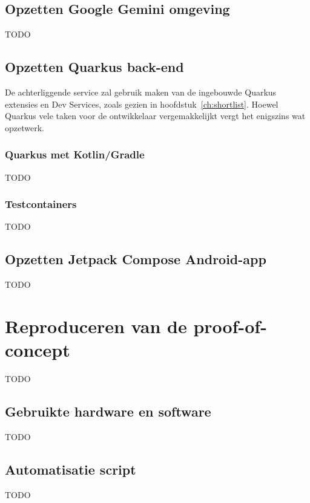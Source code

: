 \subsection{Opzetten Google Gemini omgeving}
\label{subsec:aanmaken-google-gemini-profiel}
TODO

\subsection{Opzetten Quarkus back-end}
\label{subsec:opzetten-quarkus-back-end}
De achterliggende service zal gebruik maken van de ingebouwde Quarkus extensies en Dev Services, zoals gezien in hoofdstuk~\ref{ch:shortlist}.
Hoewel Quarkus vele taken voor de ontwikkelaar vergemakkelijkt vergt het enigszins wat opzetwerk.

\subsubsection{Quarkus met Kotlin/Gradle}
TODO

\subsubsection{Testcontainers}
TODO

\subsection{Opzetten Jetpack Compose Android-app}
\label{subsec:opzetten-jetpack-compose-android-app}
TODO

\section{Reproduceren van de proof-of-concept}
\label{sec:reproduceren-van-de-proof-of-concept}
TODO

\subsection{Gebruikte hardware en software}
\label{subsec:gebruikte-hardware}
TODO

\subsection{Automatisatie script}
\label{subsec:automatisatie-script}
TODO
